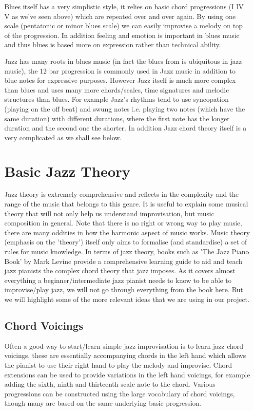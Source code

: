 \documentclass[pdftex,12pt,a4paper]{report}
\begin{document}
Blues itself has a very simplistic style, it relies on basic chord progressions (I IV V as we've seen above) which are repeated over and over again. By using one scale (pentatonic or minor blues scale) we can easily improvise a melody on top of the progression. In addition feeling and emotion is important in blues music and thus blues is based more on expression rather than technical ability. 

Jazz has many roots in blues music (in fact the blues from is ubiquitous in jazz music), the 12 bar progression is commonly used in Jazz music in addition to blue notes for expressive purposes. However Jazz itself is much more complex than blues and uses many more chords/scales, time signatures and melodic structures than blues. For example Jazz's rhythms tend to use syncopation (playing on the off beat) and swung notes i.e. playing two notes (which have the same duration) with different durations, where the first note has the longer duration and the second one the shorter. In addition Jazz chord theory itself is a very complicated as we shall see below.

\section{Basic Jazz Theory}
Jazz theory is extremely comprehensive and reflects in the complexity and the range of the music that belongs to this genre. It is useful to explain some musical theory that will not only help us understand improvisation, but music composition in general. Note that there is no right or wrong way to play music, there are many oddities in how the harmonic aspect of music works. Music theory (emphasis on the 'theory') itself only aims to formalise (and standardise) a set of rules for music knowledge. In terms of jazz theory, books such as 'The Jazz Piano Book' by Mark Levine provide a comprehensive learning guide to aid and teach jazz pianists the complex chord theory that jazz imposes. As it covers almost everything a beginner/intermediate jazz pianist needs to know to be able to improvise/play jazz, we will not go through everything from the book here. But we will highlight some of the more relevant ideas that we are using in our project.

\subsection{Chord Voicings}
Often a good way to start/learn simple jazz improvisation is to learn jazz chord voicings, these are essentially accompanying chords in the left hand which allows the pianist to use their right hand to play the melody and improvise. Chord extensions can be used to provide variations in the left hand voicings, for example adding the sixth, ninth and thirteenth scale note to the chord. Various progressions can be constructed using the large vocabulary of chord voicings, though many are based on the same underlying basic progression.
\end{document}
